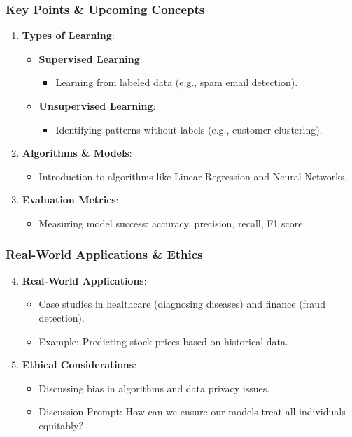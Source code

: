\documentclass[aspectratio=169]{beamer}
\begin{document}
\begin{frame}[fragile]
    \frametitle{Key Points \& Upcoming Concepts}
    \begin{enumerate}
        \item \textbf{Types of Learning}:
        \begin{itemize}
            \item \textbf{Supervised Learning}:
            \begin{itemize}
                \item Learning from labeled data (e.g., spam email detection).
            \end{itemize}
            \item \textbf{Unsupervised Learning}:
            \begin{itemize}
                \item Identifying patterns without labels (e.g., customer clustering).
            \end{itemize}
        \end{itemize}

        \item \textbf{Algorithms \& Models}:
        \begin{itemize}
            \item Introduction to algorithms like Linear Regression and Neural Networks.
        \end{itemize}

        \item \textbf{Evaluation Metrics}:
        \begin{itemize}
            \item Measuring model success: accuracy, precision, recall, F1 score.
        \end{itemize}
    \end{enumerate}
\end{frame}

\begin{frame}[fragile]
    \frametitle{Real-World Applications \& Ethics}
    \begin{enumerate}
        \setcounter{enumi}{3}
        \item \textbf{Real-World Applications}:
        \begin{itemize}
            \item Case studies in healthcare (diagnosing diseases) and finance (fraud detection).
            \item Example: Predicting stock prices based on historical data.
        \end{itemize}

        \item \textbf{Ethical Considerations}:
        \begin{itemize}
            \item Discussing bias in algorithms and data privacy issues.
            \item Discussion Prompt: How can we ensure our models treat all individuals equitably?
        \end{itemize}
    \end{enumerate}
\end{frame}
\end{document}
